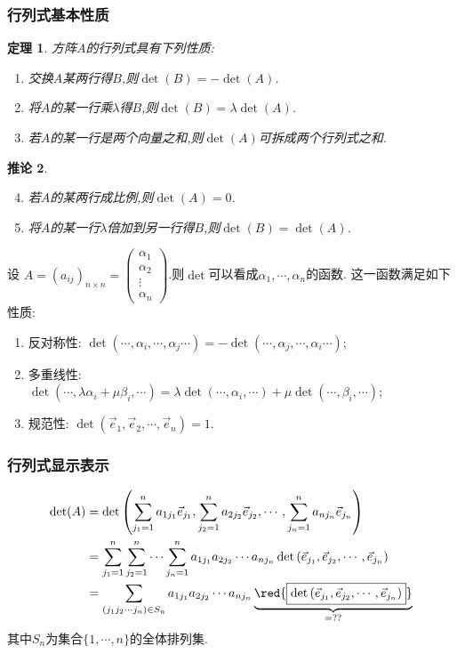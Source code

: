 \documentclass{article}
\newtheorem{theorem}{定理}  %
\newtheorem{corollary}[theorem]{推论}
\begin{document}
\subsubsection{行列式基本性质}
\begin{theorem}
方阵$A$的行列式具有下列性质:
\begin{enumerate}
\item 交换$A$某两行得$B$,则$\det(B)=-\det(A)$.
\item 将$A$的某一行乘$\lambda$得$B$,则$\det(B)=\lambda\det(A)$.
\item 若$A$的某一行是两个向量之和,则$\det(A)$可拆成两个行列式之和.
\end{enumerate}
\end{theorem}
\begin{corollary}
\begin{enumerate}\setcounter{enumi}{3}
\item 若$A$的某两行成比例,则$\det(A)=0$.
\item 将$A$的某一行$\lambda$倍加到另一行得$B$,则$\det(B)=\det(A)$.
\end{enumerate}
\end{corollary}
设 $A=(a_{ij})_{n\times n} = \begin{pmatrix}\alpha_1\\\alpha_2\\\vdots\\\alpha_n\end{pmatrix}$.则$\det$可以看成$\alpha_1,\cdots,\alpha_n$的函数.   这一函数满足如下性质:
\begin{enumerate}
\item 反对称性: $\det(\cdots,\alpha_i,\cdots,\alpha_j\cdots)=-\det(\cdots,\alpha_j,\cdots,\alpha_i\cdots)$;
\item 多重线性:  \\
$\det(\cdots,\lambda\alpha_i+\mu\beta_i,\cdots) = \lambda\det(\cdots,\alpha_i,\cdots) + \mu\det(\cdots,\beta_i,\cdots)$;
\item 规范性: $\det(\vec{e}_1,\vec{e}_2,\cdots,\vec{e}_n)=1$.
\end{enumerate}

\subsubsection{行列式显示表示}
\begin{equation*}
\begin{split}
\det(A)
& = \det\left(
\sum_{j_1=1}^{n}a_{1j_1}\vec{e}_{j_1}, \sum_{j_2=1}^{n}a_{2j_2}\vec{e}_{j_2},\cdots, \sum_{j_n=1}^{n}a_{nj_n}\vec{e}_{j_n}
\right)\\
& =\sum_{j_1=1}^{n}\sum_{j_2=1}^{n}\cdots \sum_{j_n=1}^{n} a_{1j_1}a_{2j_2}\cdots a_{nj_n}
\det\left(\vec{e}_{j_1}, \vec{e}_{j_2},\cdots, \vec{e}_{j_n}\right)\\
& =\sum_{(j_1j_2\cdots j_n)\in S_n} a_{1j_1}a_{2j_2}\cdots a_{nj_n}
\underbrace{\red{\boxed{\det\left(\vec{e}_{j_1}, \vec{e}_{j_2},\cdots, \vec{e}_{j_n}\right)}}}_{=??}\\
\end{split}
\end{equation*}
其中$S_n$为集合$\{1,\cdots,n\}$的全体排列集.
\end{document}
